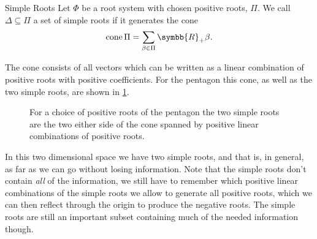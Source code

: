\documentclass[fleqn, a4paper, openany]{memoir}
\newcommand{\reals}{\symbb{R}}
\begin{document}
    \begin{dfn}{Simple Roots}{}
        Let \(\Phi\) be a root system with chosen positive roots, \(\Pi\).
        We call \(\Delta \subseteq \Pi\) a set of simple roots if it generates the cone
        \begin{equation}
            \mathop{\operatorname{cone}} \Pi = \sum_{\beta \in \Pi} \reals_+ \beta.
        \end{equation}
    \end{dfn}
    
    The cone consists of all vectors which can be written as a linear combination of positive roots with positive coefficients.
    For the pentagon this cone, as well as the two simple roots, are shown in \cref{fig:regular pentagon simple roots}.
    
    \begin{figure}
        \centering
        \caption[Simple Roots]{For a choice of positive roots of the pentagon the two simple roots are the two either side of the cone spanned by positive linear combinations of positive roots.}
        \label{fig:regular pentagon simple roots}
    \end{figure}
    
    In this two dimensional space we have two simple roots, and that is, in general, as far as we can go without losing information.
    Note that the simple roots don't contain \emph{all} of the information, we still have to remember which positive linear combinations of the simple roots we allow to generate all positive roots, which we can then reflect through the origin to produce the negative roots.
    The simple roots are still an important subset containing much of the needed information though.
\end{document}
